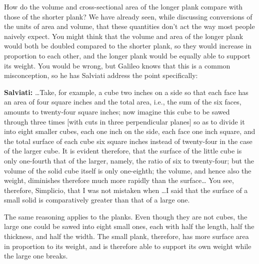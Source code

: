 How do the volume and cross-sectional area of the longer
plank compare with those of the shorter plank? We have
already seen, while discussing conversions of the units of
area and volume, that these quantities don't act the way
most people naively expect. You might think that the volume
and area of the longer plank would both be doubled compared
to the shorter plank, so they would increase in proportion
to each other, and the longer plank would be equally able to
support its weight. You would be wrong, but Galileo knows
that this is a common misconception, so he has Salviati
address the point specifically:

\textbf{Salviati:} \ldots Take, for example, a cube two inches on a side
so that each face has an area of four square inches and the
total area, i.e., the sum of the six faces, amounts to
twenty-four square inches; now imagine this cube to be sawed
through three times [with cuts in three perpendicular
planes] so as to divide it into eight smaller cubes, each
one inch on the side, each face one inch square, and the
total surface of each cube six square inches instead of
twenty-four in the case of the larger cube. It is evident
therefore, that the surface of the little cube is only
one-fourth that of the larger, namely, the ratio of six to
twenty-four; but the volume of the solid cube itself is only
one-eighth; the volume, and hence also the weight,
diminishes therefore much more rapidly than the surface\ldots
You see, therefore, Simplicio, that I was not mistaken when
\ldots I said that the surface of a small solid is comparatively
greater than that of a large one.

The same reasoning applies to the planks. Even though they
are not cubes, the large one could be sawed into eight small
ones, each with half the length, half the thickness, and
half the width. The small plank, therefore, has more surface
area in proportion to its weight, and is therefore able to
support its own weight while the large one breaks.




